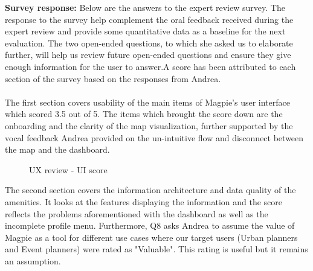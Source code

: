 \newpage
\noindent\textbf{Survey response: }
Below are the answers to the expert review survey. The response to the survey help complement the oral feedback received during the expert review and provide some quantitative data as a baseline for the next evaluation. The two open-ended questions, to which she asked us to elaborate further, will help us review future open-ended questions and ensure they give enough information for the user to answer.A score has been attributed to each section of the survey based on the responses from Andrea.\\\\
The first section covers usability of the main items of Magpie's user interface which scored 3.5 out of 5. The items which brought the score down are the onboarding and the clarity of the map visualization, further supported by the vocal feedback Andrea provided on the un-intuitive flow and disconnect between the map and the dashboard.\\
\begin{figure}
    \centering
    \caption{UX review - UI score}
\end{figure}
\newpage
The second section covers the information architecture and data quality of the amenities. It looks at the features displaying the information and the score reflects the problems aforementioned with the dashboard as well as the incomplete profile menu. Furthermore, Q8 asks Andrea to assume the value of Magpie as a tool for different use cases where our target users (Urban planners and Event planners) were rated as "Valuable". This rating is useful but it remains an assumption.\\
